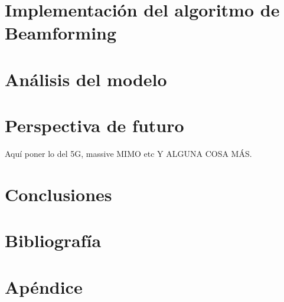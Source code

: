 \documentclass[a4paper,11pt]{book}
\begin{document}
\chapter{Implementación del algoritmo de Beamforming}

\chapter{Análisis del modelo}

\chapter{Perspectiva de futuro}
Aquí poner lo del 5G, massive MIMO etc Y ALGUNA COSA MÁS.
\chapter{Conclusiones}

\chapter{Bibliografía}

\chapter{Apéndice}





%
%
%
%
%
%
%
%
%
%
%
%
%
%
%
%
%
%
%
%
%
%
\chapter*{}
\thispagestyle{empty}
\end{document}

